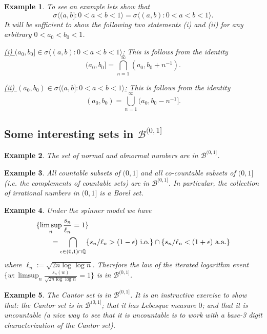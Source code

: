 \documentclass[10pt,letterpaper,twocolumn]{article}
\newtheorem{example}{Example}
\begin{document}
\begin{example}
To see an example lets show that
\[ \sigma\bigl\langle (a,b]: 0< a < b < 1 \bigr\rangle =\sigma\bigl\langle (a,b): 0< a < b <1  \bigr\rangle.\]
It will be sufficient to show the following two statements (i) and (ii) for any arbitrary $0<a_0<b_0<1$.

\noindent
\underline{(i) $(a_0,b_0]\in \sigma\langle (a,b):0<a<b<1\rangle$:}
This is follows from the identity
\[(a_0,b_0] = \bigcap_{n=1}^\infty (a_0,b_0+n^{-1} ).  \]


\noindent
\underline{(ii) $(a_0,b_0)\in \sigma\langle (a,b]:0<a<b<1\rangle$:}
This is follows from the identity
\[(a_0,b_0) = \bigcup_{n=1}^\infty (a_0,b_0-n^{-1}  ].  \]

\end{example}


\subsection{Some interesting sets in $\mathcal B^{(0,1]}$}

\begin{example}
The set of normal and abnormal numbers are in $\mathcal B^{(0,1]}$.
\end{example}

\begin{example}
All countable subsets of $(0,1]$ and  all co-countable subsets of $(0,1]$ (i.e. the complements of countable sets) are in $\mathcal B^{(0,1]}$. In particular, the collection of  irrational numbers in $(0,1]$ is a Borel set.
\end{example}


\begin{example}
Under the spinner model we have
 \begin{align*}
 &\{ \limsup_n \frac{s_n}{\ell_n}=1  \}\\
 &\qquad=\bigcap_{\epsilon\in (0,1)\cap \Bbb Q} \{ {s_n/\ell_n}> (1-\epsilon) \text{  i.o.} \}\cap \{ {s_n/\ell_n}< (1+\epsilon) \text{  a.a.} \}
 \end{align*}
 where $\ell_n:=\sqrt{2n\log\log n}$.
 Therefore the law of the iterated logarithm event $\{w: \limsup_n \frac{s_n(w)}{\sqrt{2n\log\log n}}=1  \}$ is in $\mathcal B^{(0,1]}$.
\end{example}


\begin{example}
The Cantor set is in $\mathcal B^{(0,1]}$.  It is an instructive exercise to show that: the Cantor set is in $\mathcal B^{(0,1]}$;  that it has Lebesque measure $0$; and that it is uncountable (a nice way to see that it is uncountable is to work with a base-3 digit characterization of the Cantor set).
\end{example}
\end{document}
